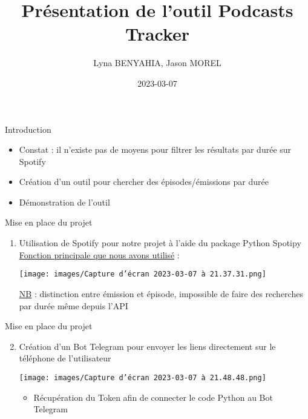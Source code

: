 \documentclass[
  ignorenonframetext,
]{beamer}
\title{Présentation de l'outil Podcasts Tracker}
\author{Lyna BENYAHIA, Jason MOREL}
\date{2023-03-07}
\providecommand{\tightlist}{%
  \setlength{\itemsep}{0pt}\setlength{\parskip}{0pt}}
\begin{document}
\frame{\titlepage}

\begin{frame}{Introduction}
\protect\hypertarget{introduction}{}
\begin{itemize}
\tightlist
\item
  Constat : il n'existe pas de moyens pour filtrer les résultats par
  durée sur Spotify
\item
  Création d'un outil pour chercher des épisodes/émissions par durée
\item
  Démonstration de l'outil
\end{itemize}
\end{frame}

\begin{frame}{Mise en place du projet}
\protect\hypertarget{mise-en-place-du-projet}{}
\begin{enumerate}
\item
  Utilisation de Spotify pour notre projet à l'aide du package Python
  Spotipy\\
  \uline{Fonction principale que nous avons utilisé} :

  \texttt{[image: images/Capture d’écran 2023-03-07 à 21.37.31.png]}

  \uline{NB} : distinction entre émission et épisode, impossible de
  faire des recherches par durée même depuis l'API
\end{enumerate}
\end{frame}

\begin{frame}{Mise en place du projet}
\protect\hypertarget{mise-en-place-du-projet-1}{}
\begin{enumerate}
\setcounter{enumi}{1}
\item
  Création d'un Bot Telegram pour envoyer les liens directement sur le
  téléphone de l'utilisateur

  \texttt{[image: images/Capture d’écran 2023-03-07 à 21.48.48.png]}

  \begin{itemize}
  \tightlist
  \item
    Récupération du Token afin de connecter le code Python au Bot
    Telegram
  \end{itemize}
\end{enumerate}
\end{frame}
\end{document}
